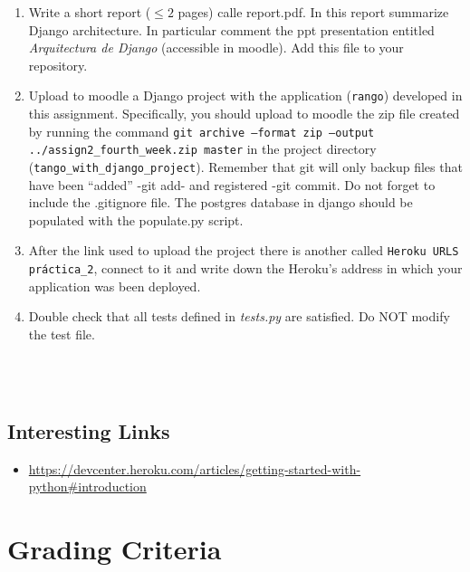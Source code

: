 \documentclass[12pt]{article} %
\begin{document}
\begin{minipage}{\linewidth}
\begin{framed}
\begin{enumerate}
 \item Write a short report ($\leq2$ pages) calle report.pdf. In this report summarize Django architecture. In particular comment the ppt presentation entitled \textit{Arquitectura de Django} (accessible in moodle). Add this file to your repository.

 \item Upload to moodle a Django project with the application (\texttt{rango}) developed in this assignment. Specifically, you should upload to moodle the  zip file created by running the command \texttt{git archive --format zip --output ../assign2\_fourth\_week.zip  master} in the project directory (\texttt{tango\_with\_django\_project}). Remember that git will only backup files that have been ``added'' -git add- and registered -git commit. Do not forget to include the .gitignore file. The postgres database in django should be populated with the populate.py script.
 
\item After the link used to upload the project there is another called \texttt{Heroku URLS práctica\_2}, connect to it and write down the Heroku's address in which your application was been deployed.

\item Double check that all tests defined in \textit{tests.py} are satisfied. Do NOT modify the test file.

\end{enumerate}
\end{framed}
\end{minipage}\\\\

\subsection{Interesting Links}

\begin{itemize}
 \item \url{https://devcenter.heroku.com/articles/getting-started-with-python#introduction}
\end{itemize}


\section{Grading Criteria}
\end{document}
